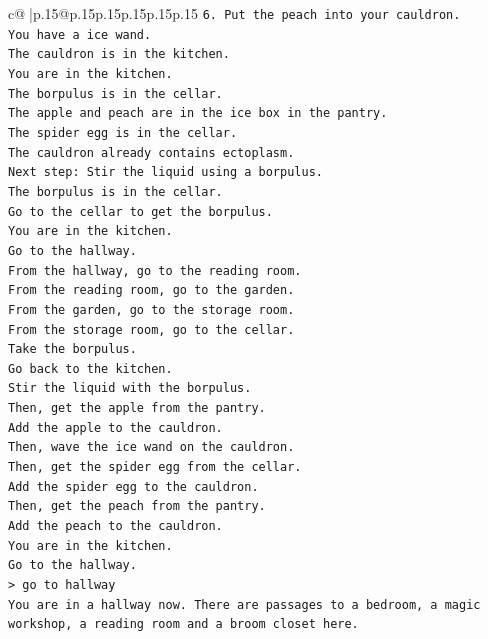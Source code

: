 \documentclass{article}
\begin{document}
{\begin{supertabular}{c@{$\;$}|p{.15\linewidth}@{}p{.15\linewidth}p{.15\linewidth}p{.15\linewidth}p{.15\linewidth}p{.15\linewidth}}
{{{\texttt{6. Put the peach into your cauldron.} \\
\texttt{You have a ice wand.} \\
\texttt{The cauldron is in the kitchen.} \\
\texttt{You are in the kitchen.} \\
\texttt{The borpulus is in the cellar.} \\
\texttt{The apple and peach are in the ice box in the pantry.} \\
\texttt{The spider egg is in the cellar.} \\
\texttt{The cauldron already contains ectoplasm.} \\
\texttt{Next step: Stir the liquid using a borpulus.} \\
\texttt{The borpulus is in the cellar.} \\
\texttt{Go to the cellar to get the borpulus.} \\
\texttt{You are in the kitchen.} \\
\texttt{Go to the hallway.} \\
\texttt{From the hallway, go to the reading room.} \\
\texttt{From the reading room, go to the garden.} \\
\texttt{From the garden, go to the storage room.} \\
\texttt{From the storage room, go to the cellar.} \\
\texttt{Take the borpulus.} \\
\texttt{Go back to the kitchen.} \\
\texttt{Stir the liquid with the borpulus.} \\
\texttt{Then, get the apple from the pantry.} \\
\texttt{Add the apple to the cauldron.} \\
\texttt{Then, wave the ice wand on the cauldron.} \\
\texttt{Then, get the spider egg from the cellar.} \\
\texttt{Add the spider egg to the cauldron.} \\
\texttt{Then, get the peach from the pantry.} \\
\texttt{Add the peach to the cauldron.} \\
\texttt{You are in the kitchen.} \\
\texttt{Go to the hallway.} \\
\texttt{> go to hallway} \\
\texttt{You are in a hallway now. There are passages to a bedroom, a magic workshop, a reading room and a broom closet here.} \\
}}}
\end{supertabular}}
\end{document}
